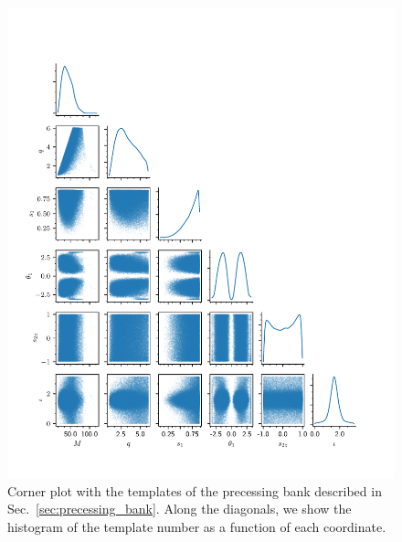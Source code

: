 \documentclass[twocolumn,showpacs,preprintnumbers,nofootinbib,prd,
superscriptaddress,10pt]{revtex4-2}
\begin{document}
\begin{figure}
	\centering
	\includegraphics[scale = 1.]{corner_precessing}
	\caption{Corner plot with the templates of the precessing bank described in Sec.~\ref{sec:precessing_bank}. Along the diagonals, we show the histogram of the template number as a function of each coordinate.}
	\label{fig:corner_precessing}
\end{figure}
\end{document}
